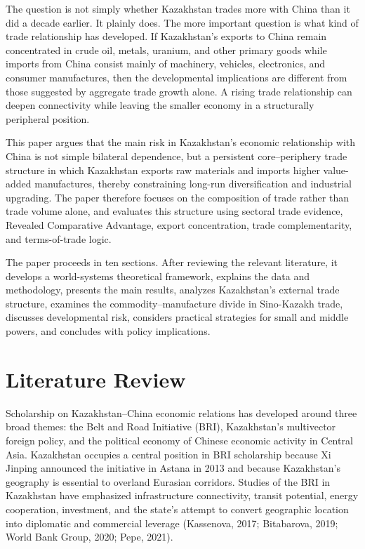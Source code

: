 \documentclass[12pt]{article}
\begin{document}
The question is not simply whether Kazakhstan trades more with China than it did a decade earlier. It plainly does. The more important question is what kind of trade relationship has developed. If Kazakhstan's exports to China remain concentrated in crude oil, metals, uranium, and other primary goods while imports from China consist mainly of machinery, vehicles, electronics, and consumer manufactures, then the developmental implications are different from those suggested by aggregate trade growth alone. A rising trade relationship can deepen connectivity while leaving the smaller economy in a structurally peripheral position.

This paper argues that the main risk in Kazakhstan's economic relationship with China is not simple bilateral dependence, but a persistent core--periphery trade structure in which Kazakhstan exports raw materials and imports higher value-added manufactures, thereby constraining long-run diversification and industrial upgrading. The paper therefore focuses on the composition of trade rather than trade volume alone, and evaluates this structure using sectoral trade evidence, Revealed Comparative Advantage, export concentration, trade complementarity, and terms-of-trade logic.

The paper proceeds in ten sections. After reviewing the relevant literature, it develops a world-systems theoretical framework, explains the data and methodology, presents the main results, analyzes Kazakhstan's external trade structure, examines the commodity--manufacture divide in Sino-Kazakh trade, discusses developmental risk, considers practical strategies for small and middle powers, and concludes with policy implications.

\section{Literature Review}

Scholarship on Kazakhstan--China economic relations has developed around three broad themes: the Belt and Road Initiative (BRI), Kazakhstan's multivector foreign policy, and the political economy of Chinese economic activity in Central Asia. Kazakhstan occupies a central position in BRI scholarship because Xi Jinping announced the initiative in Astana in 2013 and because Kazakhstan's geography is essential to overland Eurasian corridors. Studies of the BRI in Kazakhstan have emphasized infrastructure connectivity, transit potential, energy cooperation, investment, and the state's attempt to convert geographic location into diplomatic and commercial leverage (Kassenova, 2017; Bitabarova, 2019; World Bank Group, 2020; Pepe, 2021).
\end{document}
